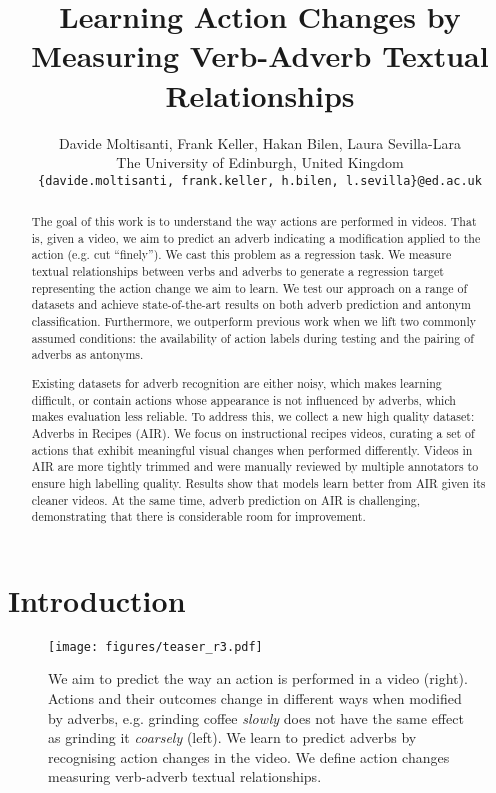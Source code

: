 \documentclass[10pt,twocolumn,letterpaper]{article}
\begin{document}
\title{Learning Action Changes by Measuring Verb-Adverb Textual Relationships}

\author{Davide Moltisanti, Frank Keller, Hakan Bilen, Laura Sevilla-Lara\\
The University of Edinburgh, United Kingdom\\
{\tt\small \{davide.moltisanti, frank.keller, h.bilen, l.sevilla\}@ed.ac.uk}
}
\maketitle

\begin{abstract}
The goal of this work is to understand the way actions are performed 
in videos. That is, given a video, we aim to predict an adverb indicating a modification applied to the action 
(e.g. cut ``finely''). 
We cast this problem as a regression task. 
We measure textual relationships between verbs and adverbs to generate a regression target representing the action change we aim to learn.
We test our approach on a range of datasets and achieve state-of-the-art results on both adverb prediction and antonym classification.
Furthermore, we outperform previous work when we lift two commonly assumed 
conditions: 
the availability of action labels during testing and the pairing of adverbs as antonyms. 

Existing datasets for adverb recognition 
are either noisy, which makes learning difficult, or contain actions whose
appearance is not influenced by adverbs, which makes evaluation less reliable.
To address this, we collect a new high quality dataset: Adverbs in Recipes (AIR). We focus on instructional recipes videos, curating a set of actions that exhibit meaningful visual changes when performed differently. Videos in AIR are more tightly trimmed and 
were manually reviewed by multiple annotators to ensure high labelling quality. 
Results show that models learn better from AIR given its cleaner videos. At the same time, adverb prediction on AIR is challenging, demonstrating that there is considerable room for improvement.

\end{abstract}

\vspace{-10pt}
\section{Introduction}
\label{sec:intro}

\begin{figure}
    \centering
    \texttt{[image: figures/teaser\_r3.pdf]}
    \caption{We aim to predict the way an action is performed in a video (right). Actions and their outcomes change in different ways when modified by adverbs, e.g. grinding coffee \textit{slowly} does not have the same effect as grinding it \textit{coarsely} (left). We learn to predict adverbs by recognising action changes in the video. We define action changes measuring verb-adverb textual relationships.}
    \label{fig:teaser}    
\end{figure}
\end{document}
